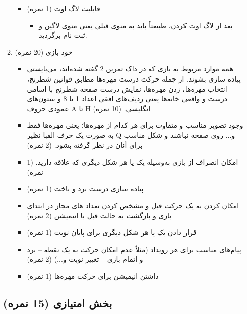 \documentclass[]{article}
\begin{document}
\begin{itemize}[label = {$\blacksquare$}]
\begin{enumerate}
\begin{itemize}[label = $\circ$]
\item
قابلیت لاگ اوت (1 نمره)

\begin{itemize}[label = $\Leftarrow$]
\item
بعد از لاگ اوت کردن، طبیعتاً باید به منوی قبلی یعنی منوی لاگین و ثبت نام برگردید.
\end{itemize}

\end{itemize}

\item
خود بازی (20 نمره)

\begin{itemize}[label = $\circ$]

\item
همه موارد مربوط به بازی که در داک تمرین 2 گفته شده‌اند، می‌بایستی پیاده سازی بشوند. از جمله حرکت درست مهره‌ها مطابق قوانین شطرنج، انتخاب مهره‌ها، زدن مهره‌ها، نمایش درست صفحه شطرنج با اسامی درست و واقعی خانه‌ها یعنی ردیف‌های افقی اعداد 1 تا 8 و ستون‌های عمودی حروف A تا H انگلیسی. (10 نمره)

\item
وجود تصویر مناسب و متفاوت برای هر کدام از مهره‌ها؛ یعنی مهره‌ها فقط به صورت یک حرف الفبا نظیر Q و... روی صفحه نباشند و شکل مناسب برای آنان در نظر گرفته بشود. (2 نمره)

\item
امکان انصراف از بازی به‌وسیله یک  یا هر شکل دیگری که علاقه دارید. (1 نمره)

\item
پیاده سازی درست برد و باخت (1 نمره)

\item
امکان  کردن به یک حرکت قبل و مشخص کردن تعداد  های مجاز در ابتدای بازی و بازگشت به حالت قبل با انیمیشن (2 نمره)

\item
قرار دادن یک  یا هر شکل دیگری برای پایان نوبت (1 نمره)

\item
پیام‌های مناسب برای هر رویداد (مثلاً عدم امکان حرکت به یک نقطه – برد و اتمام بازی – تغییر نوبت و...) (2 نمره)

\item
داشتن انیمیشن برای حرکت مهره‌ها (1 نمره)

\end{itemize}

\end{enumerate}


\subsection{بخش امتیازی (15 نمره)}


\end{itemize}
\end{document}
